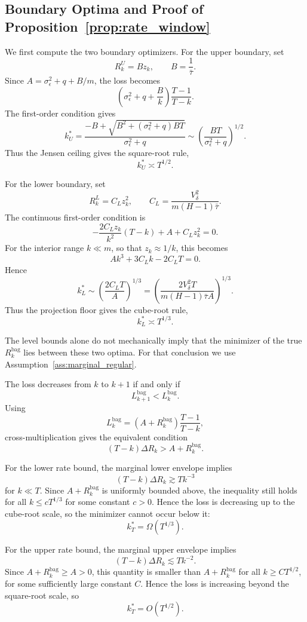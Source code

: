 \subsection{Boundary Optima and Proof of Proposition~\ref{prop:rate_window}}

We first compute the two boundary optimizers.  For the upper boundary, set
\[
  R_k^U=Bz_k,
  \qquad
  B=\frac{1}{\bar\tau}.
\]
Since $A=\sigma_\epsilon^2+q+B/m$, the loss becomes
\[
  \left(\sigma_\epsilon^2+q+\frac{B}{k}\right)
  \frac{T-1}{T-k}.
\]
The first-order condition gives
\[
  k_U^*
  =
  \frac{
    -B+\sqrt{B^2+(\sigma_\epsilon^2+q)BT}
  }{
    \sigma_\epsilon^2+q
  }
  \sim
  \left(
    \frac{BT}{\sigma_\epsilon^2+q}
  \right)^{1/2}.
\]
Thus the Jensen ceiling gives the square-root rule,
\[
  k_U^*\asymp T^{1/2}.
\]

For the lower boundary, set
\[
  R_k^L=C_Lz_k^2,
  \qquad
  C_L=\frac{V_\delta^2}{m(H-1)\bar\tau}.
\]
The continuous first-order condition is
\[
  -\frac{2C_Lz_k}{k^2}(T-k)+A+C_Lz_k^2=0.
\]
For the interior range $k\ll m$, so that $z_k\approx1/k$, this becomes
\[
  Ak^3+3C_Lk-2C_LT=0.
\]
Hence
\[
  k_L^*
  \sim
  \left(
    \frac{2C_LT}{A}
  \right)^{1/3}
  =
  \left(
    \frac{2V_\delta^2T}
    {m(H-1)\bar\tau A}
  \right)^{1/3}.
\]
Thus the projection floor gives the cube-root rule,
\[
  k_L^*\asymp T^{1/3}.
\]

The level bounds alone do not mechanically imply that the minimizer of the
true $R_k^{\mathrm{bag}}$ lies between these two optima.  For that conclusion
we use Assumption~\ref{ass:marginal_regular}.

The loss decreases from $k$ to $k+1$ if and only if
\[
  L_{k+1}^{\mathrm{bag}}<L_k^{\mathrm{bag}}.
\]
Using
\[
  L_k^{\mathrm{bag}}
  =
  \left(A+R_k^{\mathrm{bag}}\right)\frac{T-1}{T-k},
\]
cross-multiplication gives the equivalent condition
\[
  (T-k)\Delta R_k>A+R_k^{\mathrm{bag}}.
\]

For the lower rate bound, the marginal lower envelope implies
\[
  (T-k)\Delta R_k\gtrsim Tk^{-3}
\]
for $k\ll T$.  Since $A+R_k^{\mathrm{bag}}$ is uniformly bounded above,
the inequality still holds for all $k\le cT^{1/3}$ for some constant
$c>0$.  Hence the loss is decreasing up to the cube-root scale, so the
minimizer cannot occur below it:
\[
  k_T^*=\Omega(T^{1/3}).
\]

For the upper rate bound, the marginal upper envelope implies
\[
  (T-k)\Delta R_k\lesssim Tk^{-2}.
\]
Since $A+R_k^{\mathrm{bag}}\ge A>0$, this quantity is smaller than
$A+R_k^{\mathrm{bag}}$ for all $k\ge CT^{1/2}$, for some sufficiently large
constant $C$.  Hence the loss is increasing beyond the square-root scale,
so
\[
  k_T^*=O(T^{1/2}).
\]
